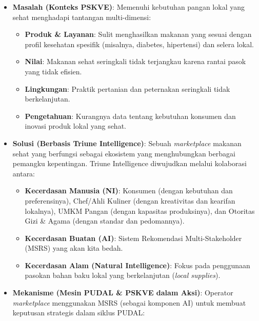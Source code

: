 \documentclass[
  letterpaper,
  DIV=11,
  numbers=noendperiod]{scrreprt}
\providecommand{\tightlist}{%
  \setlength{\itemsep}{0pt}\setlength{\parskip}{0pt}}
\begin{document}
\begin{itemize}
\tightlist
\item
  \textbf{Masalah (Konteks PSKVE)}: Memenuhi kebutuhan pangan lokal yang
  sehat menghadapi tantangan multi-dimensi:

  \begin{itemize}
  \tightlist
  \item
    \textbf{Produk \& Layanan}: Sulit menghasilkan makanan yang sesuai
    dengan profil kesehatan spesifik (misalnya, diabetes, hipertensi)
    dan selera lokal.
  \item
    \textbf{Nilai}: Makanan sehat seringkali tidak terjangkau karena
    rantai pasok yang tidak efisien.
  \item
    \textbf{Lingkungan}: Praktik pertanian dan peternakan seringkali
    tidak berkelanjutan.
  \item
    \textbf{Pengetahuan}: Kurangnya data tentang kebutuhan konsumen dan
    inovasi produk lokal yang sehat.
  \end{itemize}
\item
  \textbf{Solusi (Berbasis Triune Intelligence)}: Sebuah
  \emph{marketplace} makanan sehat yang berfungsi sebagai ekosistem yang
  menghubungkan berbagai pemangku kepentingan. Triune Intelligence
  diwujudkan melalui kolaborasi antara:

  \begin{itemize}
  \tightlist
  \item
    \textbf{Kecerdasan Manusia (NI)}: Konsumen (dengan kebutuhan dan
    preferensinya), Chef/Ahli Kuliner (dengan kreativitas dan kearifan
    lokalnya), UMKM Pangan (dengan kapasitas produksinya), dan Otoritas
    Gizi \& Agama (dengan standar dan pedomannya).
  \item
    \textbf{Kecerdasan Buatan (AI)}: Sistem Rekomendasi
    Multi-Stakeholder (MSRS) yang akan kita bedah.
  \item
    \textbf{Kecerdasan Alam (Natural Intelligence)}: Fokus pada
    penggunaan pasokan bahan baku lokal yang berkelanjutan (\emph{local
    supplies}).
  \end{itemize}
\item
  \textbf{Mekanisme (Mesin PUDAL \& PSKVE dalam Aksi)}: Operator
  \emph{marketplace} menggunakan MSRS (sebagai komponen AI) untuk
  membuat keputusan strategis dalam siklus PUDAL:


\end{itemize}
\end{document}

